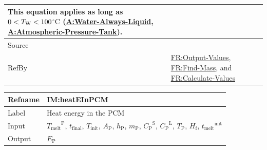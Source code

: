 \documentclass[12pt]{article}
\newcommand{\lt}{\ensuremath <}
\begin{document}
\begin{minipage}{\textwidth}
\begin{tabular}{>{\raggedright}p{}>{\raggedright\arraybackslash}p{}}
        This equation applies as long as $0\lt{}{T_{\text{W}}}\lt{}100$${{}^{\circ}\text{C}}$ (\hyperref[assumpWAL]{A:Water-Always-Liquid}, \hyperref[assumpAPT]{A:Atmospheric-Pressure-Tank}).
        
\\ \midrule
Source & \cite{koothoor2013}
         
\\ \midrule
RefBy & \hyperref[outputValues]{FR:Output-Values}, \hyperref[findMass]{FR:Find-Mass}, and \hyperref[calcValues]{FR:Calculate-Values}
        
\\ \bottomrule
\end{tabular}
\end{minipage}

\medskip
\noindent
\begin{minipage}{\textwidth}
\begin{tabular}{>{\raggedright}p{}>{\raggedright\arraybackslash}p{}}
\toprule \textbf{Refname} & \textbf{IM:heatEInPCM}
\label{IM:heatEInPCM}
\\ \midrule
Label & Heat energy in the PCM
        
\\ \midrule
Input & ${{T_{\text{melt}}}^{\text{P}}}$, ${t_{\text{final}}}$, ${T_{\text{init}}}$, ${A_{\text{P}}}$, ${h_{\text{P}}}$, ${m_{\text{P}}}$, ${{C_{\text{P}}}^{\text{S}}}$, ${{C_{\text{P}}}^{\text{L}}}$, ${T_{\text{P}}}$, ${H_{\text{f}}}$, ${{t_{\text{melt}}}^{\text{init}}}$
        
\\ \midrule
Output & ${E_{\text{P}}}$
         

\end{tabular}
\end{minipage}
\end{document}
